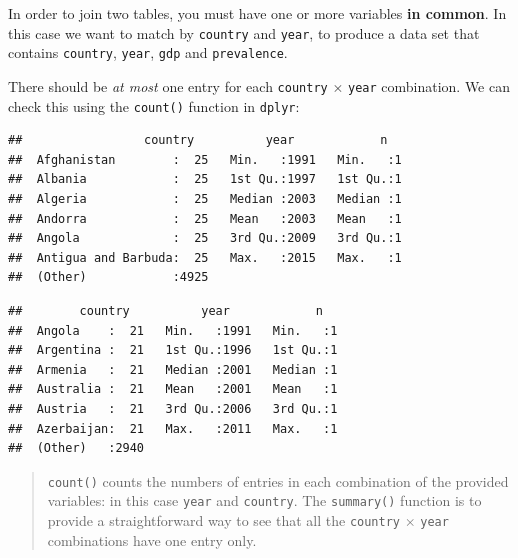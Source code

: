 \documentclass[]{book}
\newenvironment{Shaded}{\begin{snugshade}}{\end{snugshade}}
\newcommand{\KeywordTok}[1]{\textcolor[rgb]{0.13,0.29,0.53}{\textbf{{#1}}}}
\newcommand{\StringTok}[1]{\textcolor[rgb]{0.31,0.60,0.02}{{#1}}}
\newcommand{\NormalTok}[1]{{#1}}
\theoremstyle{definition}
\theoremstyle{definition}
\theoremstyle{definition}
\theoremstyle{remark}
\begin{document}
In order to join two tables, you must have one or more variables
\textbf{in common}. In this case we want to match by \texttt{country}
and \texttt{year}, to produce a data set that contains \texttt{country},
\texttt{year}, \texttt{gdp} and \texttt{prevalence}.

There should be \emph{at most} one entry for each \texttt{country}
\(\times\) \texttt{year} combination. We can check this using the
\texttt{count()} function in \texttt{dplyr}:

\begin{Shaded}
\end{Shaded}

\begin{verbatim}
##                 country          year            n    
##  Afghanistan        :  25   Min.   :1991   Min.   :1  
##  Albania            :  25   1st Qu.:1997   1st Qu.:1  
##  Algeria            :  25   Median :2003   Median :1  
##  Andorra            :  25   Mean   :2003   Mean   :1  
##  Angola             :  25   3rd Qu.:2009   3rd Qu.:1  
##  Antigua and Barbuda:  25   Max.   :2015   Max.   :1  
##  (Other)            :4925
\end{verbatim}

\begin{Shaded}
\end{Shaded}

\begin{verbatim}
##        country          year            n    
##  Angola    :  21   Min.   :1991   Min.   :1  
##  Argentina :  21   1st Qu.:1996   1st Qu.:1  
##  Armenia   :  21   Median :2001   Median :1  
##  Australia :  21   Mean   :2001   Mean   :1  
##  Austria   :  21   3rd Qu.:2006   3rd Qu.:1  
##  Azerbaijan:  21   Max.   :2011   Max.   :1  
##  (Other)   :2940
\end{verbatim}

\begin{quote}
\texttt{count()} counts the numbers of entries in each combination of
the provided variables: in this case \texttt{year} and \texttt{country}.
The \texttt{summary()} function is to provide a straightforward way to
see that all the \texttt{country} \(\times\) \texttt{year} combinations
have one entry only.
\end{quote}
\end{document}
